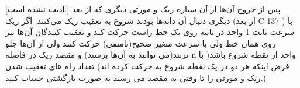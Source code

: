 [ادیت نشده است.]
\p 
        پس از خروج آن‌ها از آن سیاره ریک و مورتی دیگری که از بعد دیگری دنبال آن دانه‌ها بودند شروع به تعقیب ریک می‌کنند. اگر ریک (از بعد C-137 ) با سرعت ثابت 1 واحد در ثانیه روی یک خط راست حرکت کند و تعقیب کنندگان آن‌ها نیز روی همان خط ولی با سرعت متغیر صحیح(نامنفی) حرکت کنند ولی از آن‌ها جلو نزنند(می توانند به آن‌ها برسند) و مقصد ریک در فاصله n واحد از نقطه شروع باشد( با فرض اینکه هر دو در یک نقطه شروع به حرکت کرده اند) تعداد راه های تعقیب شدن ریک و مورتی را تا وقتی به مقصد می رسند به صورت بازگشتی حساب کنید.)
        
    